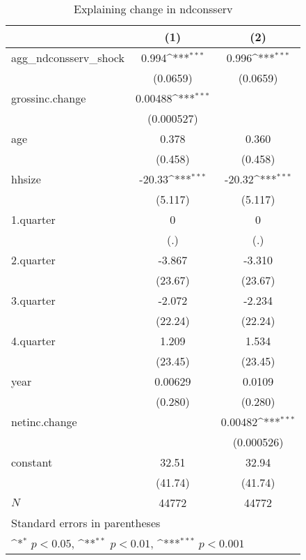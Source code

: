\begin{table}[htbp]\centering
\def\sym#1{\ifmmode^{#1}\else\(^{#1}\)\fi}
\caption{\label{tab:ndconsserv-deltacons} Explaining change in ndconsserv}
\begin{tabular}{l*{2}{c}}
\hline\hline
            &\multicolumn{1}{c}{(1)}         &\multicolumn{1}{c}{(2)}         \\
\hline
agg\_ndconsserv\_shock&       0.994\sym{***}&       0.996\sym{***}\\
            &    (0.0659)         &    (0.0659)         \\
grossinc.change&     0.00488\sym{***}&                     \\
            &  (0.000527)         &                     \\
age         &       0.378         &       0.360         \\
            &     (0.458)         &     (0.458)         \\
hhsize      &      -20.33\sym{***}&      -20.32\sym{***}\\
            &     (5.117)         &     (5.117)         \\
1.quarter   &           0         &           0         \\
            &         (.)         &         (.)         \\
2.quarter   &      -3.867         &      -3.310         \\
            &     (23.67)         &     (23.67)         \\
3.quarter   &      -2.072         &      -2.234         \\
            &     (22.24)         &     (22.24)         \\
4.quarter   &       1.209         &       1.534         \\
            &     (23.45)         &     (23.45)         \\
year        &     0.00629         &      0.0109         \\
            &     (0.280)         &     (0.280)         \\
netinc.change&                     &     0.00482\sym{***}\\
            &                     &  (0.000526)         \\
constant    &       32.51         &       32.94         \\
            &     (41.74)         &     (41.74)         \\
\hline
\(N\)       &       44772         &       44772         \\
\hline\hline
\multicolumn{3}{l}{\footnotesize Standard errors in parentheses}\\
\multicolumn{3}{l}{\footnotesize \sym{*} \(p<0.05\), \sym{**} \(p<0.01\), \sym{***} \(p<0.001\)}\\
\end{tabular}
\end{table}
